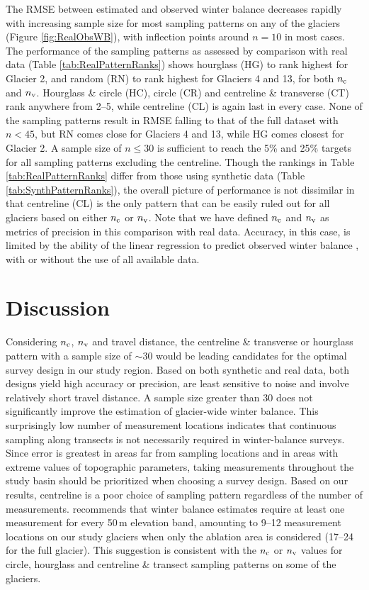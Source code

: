 \documentclass[twocolumn,letterpaper]{igs}
\begin{document}
The RMSE between estimated and observed winter balance decreases rapidly with increasing sample size for most sampling patterns on any of the glaciers (Figure \ref{fig:RealObsWB}), with inflection points around $n=10$ in most cases. 
The performance of the sampling patterns as assessed by comparison with real data (Table \ref{tab:RealPatternRanks}) shows hourglass (HG) to rank highest for Glacier 2, and random (RN) to rank highest for Glaciers 4 and 13, for both $n_{\rm c}$ and $n_{\rm v}$. Hourglass \& circle (HC), circle (CR) and centreline \& transverse (CT) rank anywhere from 2--5, while centreline (CL) is again last in every case. 
None of the sampling patterns result in RMSE falling to that of the full dataset with $n < 45$, but RN comes close for Glaciers 4 and 13, while HG comes closest for Glacier 2. A sample size of $n \leq 30$ is sufficient to reach the 5\% and 25\% targets for all sampling patterns excluding the centreline. 
Though the rankings in Table \ref{tab:RealPatternRanks} differ from those using synthetic data (Table \ref{tab:SynthPatternRanks}), the overall picture of performance is not dissimilar in that centreline (CL) is the only pattern that can be easily ruled out for all glaciers based on either $n_{\rm c}$ or $n_{\rm v}$.  
Note that  we have defined $n_{\rm c}$ and $n_{\rm v}$ as metrics of precision in this comparison with real data. Accuracy, in this case, is limited by the ability of the linear regression to predict observed winter balance \citep[see][]{Pulwicki2017}, with or without the use of all available data. 
    

\section{Discussion}

Considering $n_{\rm c}$, $n_{\rm v}$ and travel distance, the centreline \& transverse or hourglass pattern with a sample size of $\sim30$ would be leading candidates for the optimal survey design in our study region. Based on both synthetic and real data, both designs yield high accuracy or precision, are least sensitive to noise and involve relatively short travel distance. A sample size greater than 30 does not significantly improve the estimation of glacier-wide winter balance. This surprisingly low number of measurement locations indicates that continuous sampling along transects is not necessarily required in winter-balance surveys. Since error is greatest in areas far from sampling locations and in areas with extreme values of topographic parameters, taking measurements throughout the study basin should be prioritized when choosing a survey design.  Based on our results, centreline is a poor choice of sampling pattern regardless of the number of measurements. \cite{Walmsley2015} recommends that winter balance estimates require at least one measurement for every 50\,m elevation band, amounting to 9--12 measurement locations on our study glaciers when only the ablation area is considered (17--24 for the full glacier). This suggestion is consistent with the $n_{\rm c}$ or $n_{\rm v}$ values for circle, hourglass and centreline \& transect sampling patterns on some of the glaciers.
\end{document}
